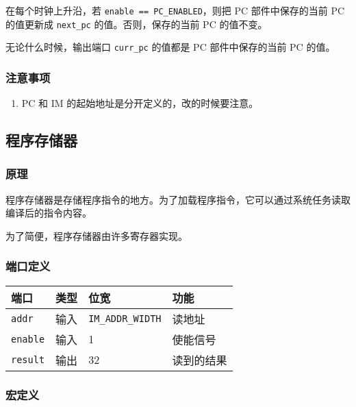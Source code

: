 在每个时钟上升沿，若 \texttt{enable\ ==\ PC\_ENABLED}，则把 PC
部件中保存的当前 PC 的值更新成 \texttt{next\_pc} 的值。否则，保存的当前
PC 的值不变。

无论什么时候，输出端口 \texttt{curr\_pc} 的值都是 PC 部件中保存的当前 PC
的值。

\hypertarget{ux6ce8ux610fux4e8bux9879-1}{%
\subsubsection{注意事项}\label{ux6ce8ux610fux4e8bux9879-1}}

\begin{enumerate}
\def\labelenumi{\arabic{enumi}.}
\tightlist
\item
  PC 和 IM 的起始地址是分开定义的，改的时候要注意。
\end{enumerate}

\hypertarget{ux7a0bux5e8fux5b58ux50a8ux5668}{%
\subsection{程序存储器}\label{ux7a0bux5e8fux5b58ux50a8ux5668}}

\hypertarget{ux539fux7406-1}{%
\subsubsection{原理}\label{ux539fux7406-1}}

程序存储器是存储程序指令的地方。为了加载程序指令，它可以通过系统任务读取编译后的指令内容。

为了简便，程序存储器由许多寄存器实现。

\hypertarget{ux7aefux53e3ux5b9aux4e49-1}{%
\subsubsection{端口定义}\label{ux7aefux53e3ux5b9aux4e49-1}}

\begin{longtable}[]{@{}llll@{}}
\toprule
端口 & 类型 & 位宽 & 功能\tabularnewline
\midrule
\endhead
\texttt{addr} & 输入 & \texttt{IM\_ADDR\_WIDTH} & 读地址\tabularnewline
\texttt{enable} & 输入 & 1 & 使能信号\tabularnewline
\texttt{result} & 输出 & 32 & 读到的结果\tabularnewline
\bottomrule
\end{longtable}

\hypertarget{ux5b8fux5b9aux4e49-2}{%
\subsubsection{宏定义}\label{ux5b8fux5b9aux4e49-2}}

